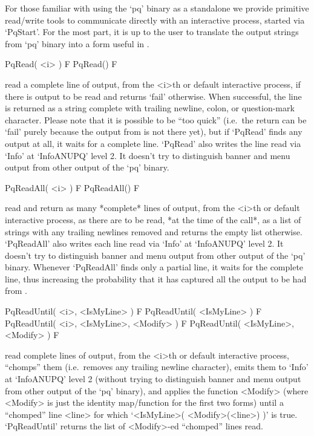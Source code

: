 
For those familiar with using the `pq' binary as a standalone we  provide
primitive read/write tools to communicate directly  with  an  interactive
{\ANUPQ} process, started via `PqStart'. For the most part, it is  up  to
the user to translate the output strings from `pq'  binary  into  a  form
useful in {\GAP}.

\>PqRead( <i> ) F
\>PqRead() F

read a complete line of  {\ANUPQ}  output,  from  the  <i>th  or  default
interactive {\ANUPQ} process, if there is output to be read  and  returns
`fail' otherwise. When successful, the  line  is  returned  as  a  string
complete with trailing newline, colon, or question-mark character. Please
note that it is possible to be ``too  quick''  (i.e.~the  return  can  be
`fail' purely because the output from {\ANUPQ} is not there yet), but  if
`PqRead' finds any output at all, it waits for a complete line.  `PqRead'
also writes the line read via `Info' at `InfoANUPQ' level 2.  It  doesn't
try to distinguish banner and menu output from other output of  the  `pq'
binary.

\>PqReadAll( <i> ) F
\>PqReadAll() F

read and return as many *complete* lines of  {\ANUPQ}  output,  from  the
<i>th or default interactive {\ANUPQ} process, as there are to  be  read,
*at the time of the call*,  as  a  list  of  strings  with  any  trailing
newlines removed and returns the empty list otherwise.  `PqReadAll'  also
writes each line read via `Info' at `InfoANUPQ' level 2. It  doesn't  try
to distinguish banner and menu output  from  other  output  of  the  `pq'
binary. Whenever `PqReadAll' finds only a partial line, it waits for  the
complete line, thus increasing the probability that it has  captured  all
the output to be had from {\ANUPQ}.

\>PqReadUntil( <i>, <IsMyLine> ) F
\>PqReadUntil( <IsMyLine> ) F
\>PqReadUntil( <i>, <IsMyLine>, <Modify> ) F
\>PqReadUntil( <IsMyLine>, <Modify> ) F

read complete lines  of  {\ANUPQ}  output,  from  the  <i>th  or  default
interactive {\ANUPQ} process, ``chomps'' them (i.e.~removes any  trailing
newline character), emits them to `Info' at `InfoANUPQ' level 2  (without
trying to distinguish banner and menu output from  other  output  of  the
`pq' binary), and applies the function <Modify> (where <Modify>  is  just
the identity map/function for the first two forms)  until  a  ``chomped''
line  <line>  for  which  `<IsMyLine>(  <Modify>(<line>)  )'   is   true.
`PqReadUntil' returns the list of <Modify>-ed ``chomped'' lines read.

